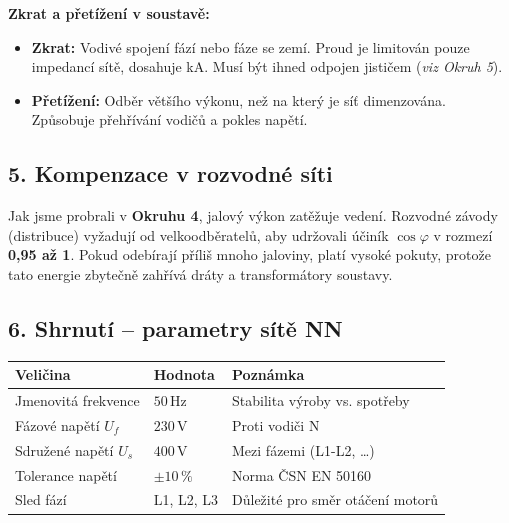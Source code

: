 \documentclass[a4paper,10pt]{article}
\begin{document}
\begin{vysvetlenibox}
\begin{durazbox}
\textbf{Zkrat a přetížení v soustavě:}
\begin{itemize}
    \item \textbf{Zkrat:} Vodivé spojení fází nebo fáze se zemí. Proud je limitován pouze impedancí sítě, dosahuje kA. Musí být ihned odpojen jističem (\textit{viz Okruh 5}).
    \item \textbf{Přetížení:} Odběr většího výkonu, než na který je síť dimenzována. Způsobuje přehřívání vodičů a pokles napětí.
\end{itemize}
\end{durazbox}

\subsection*{5. Kompenzace v rozvodné síti}

Jak jsme probrali v \textbf{Okruhu 4}, jalový výkon zatěžuje vedení. Rozvodné závody (distribuce) vyžadují od velkoodběratelů, aby udržovali účiník $\cos \varphi$ v rozmezí \textbf{0,95 až 1}. Pokud odebírají příliš mnoho jaloviny, platí vysoké pokuty, protože tato energie zbytečně zahřívá dráty a transformátory soustavy.

\subsection*{6. Shrnutí – parametry sítě NN}

\begin{center}
\begin{tabularx}{0.97\linewidth}{@{} l l X @{}}
\toprule
\textbf{Veličina} & \textbf{Hodnota} & \textbf{Poznámka} \\
\midrule
Jmenovitá frekvence & $50\,\mathrm{Hz}$ & Stabilita výroby vs. spotřeby \\
Fázové napětí $U_f$ & $230\,\mathrm{V}$ & Proti vodiči N \\
Sdružené napětí $U_s$ & $400\,\mathrm{V}$ & Mezi fázemi (L1-L2, \ldots) \\
Tolerance napětí & $\pm 10\,\%$ & Norma ČSN EN 50160 \\
Sled fází & L1, L2, L3 & Důležité pro směr otáčení motorů \\
\bottomrule
\end{tabularx}
\end{center}

\end{vysvetlenibox}
\end{document}
